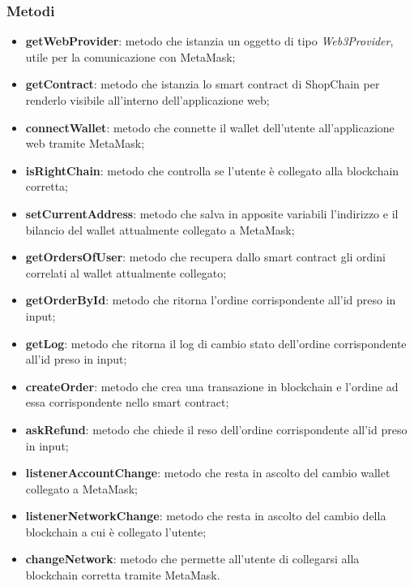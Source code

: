 \subsubsection{Metodi}
\begin{itemize}
    \item \textbf{getWebProvider}: metodo che istanzia un oggetto di tipo \textit{Web3Provider}, utile per la comunicazione con MetaMask;
    \item \textbf{getContract}: metodo che istanzia lo smart contract di ShopChain per renderlo visibile all'interno dell'applicazione web;
    \item \textbf{connectWallet}: metodo che connette il wallet dell'utente all'applicazione web tramite MetaMask;
    \item \textbf{isRightChain}: metodo che controlla se l'utente è collegato alla blockchain corretta;
    \item \textbf{setCurrentAddress}: metodo che salva in apposite variabili l'indirizzo e il bilancio del wallet attualmente collegato a MetaMask;
    \item \textbf{getOrdersOfUser}: metodo che recupera dallo smart contract gli ordini correlati al wallet attualmente collegato;
    \item \textbf{getOrderById}: metodo che ritorna l'ordine corrispondente all'id preso in input;
    \item \textbf{getLog}: metodo che ritorna il log di cambio stato dell'ordine corrispondente all'id preso in input;
    \item \textbf{createOrder}: metodo che crea una transazione in blockchain e l'ordine ad essa corrispondente nello smart contract;
    \item \textbf{askRefund}: metodo che chiede il reso dell'ordine corrispondente all'id preso in input;
    \item \textbf{listenerAccountChange}: metodo che resta in ascolto del cambio wallet collegato a MetaMask;
    \item \textbf{listenerNetworkChange}: metodo che resta in ascolto del cambio della blockchain a cui è collegato l'utente;
    \item \textbf{changeNetwork}: metodo che permette all'utente di collegarsi alla blockchain corretta tramite MetaMask.
\end{itemize}


\newpage

